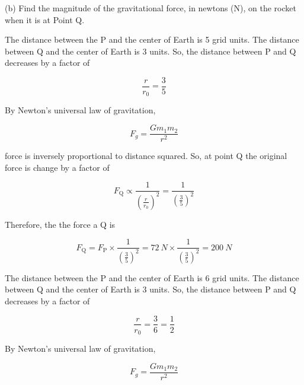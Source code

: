 \documentclass[answers]{exam}
\newif\ifversionKlevel
\begin{document}
\begin{questions}
(b) Find the magnitude of the gravitational force, in newtons (N), on the rocket when it is at Point Q.

\ifversionKlevel
    \begin{solutionorbox}[7cm]
    The distance between the P and the center of Earth is 5 grid units. The distance between Q and the center of Earth is 3 units. So, the distance between P and Q decreases by a factor of 
    
    \begin{equation*}
        \frac{r}{r_0} = \frac{3}{5}
    \end{equation*}
    
    By Newton's universal law of gravitation,
    
    \begin{equation*}
        F_g = \frac{Gm_1 m_2}{r^2}
    \end{equation*}
    
    force is inversely proportional to distance squared. So, at point Q the original force is change by a factor of 
    
    \begin{equation*}
        F_\mathrm{Q} \propto \frac{1}{\left(\displaystyle \frac{r}{r_0}\right)^2} = \frac{1}{\left(\displaystyle \frac{3}{5}\right)^2}
    \end{equation*}
    
    Therefore, the the force a Q is
    
    \begin{equation*}
        F_\mathrm{Q} = F_\mathrm{P} \times \frac{1}{\left(\displaystyle \frac{3}{5}\right)^2} = \SI{72}{N} \times \frac{1}{\left(\displaystyle \frac{3}{5}\right)^2} = \boxed{\SI{200}{N}}
    \end{equation*}
    \end{solutionorbox}
\else
    \begin{solutionorbox}[10cm]
    The distance between the P and the center of Earth is 6 grid units. The distance between Q and the center of Earth is 3 units. So, the distance between P and Q decreases by a factor of 
    
    \begin{equation*}
        \frac{r}{r_0} = \frac{3}{6} = \frac{1}{2}
    \end{equation*}
    
    By Newton's universal law of gravitation,
    
    \begin{equation*}
        F_g = \frac{Gm_1 m_2}{r^2}
    \end{equation*}
    

\end{solutionorbox}
\end{questions}
\end{document}
